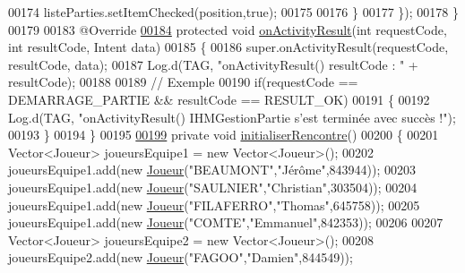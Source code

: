 \begin{DoxyCode}
00174                 listeParties.setItemChecked(position,\textcolor{keyword}{true});
00175 
00176             \}
00177         \});
00178     \}
00179 
00183     @Override
\hyperlink{classcom_1_1example_1_1area_1_1_i_h_m_gestion_rencontre_a2ab13355dbd1751f43ff54c534d0f021}{00184}     \textcolor{keyword}{protected} \textcolor{keywordtype}{void} \hyperlink{classcom_1_1example_1_1area_1_1_i_h_m_gestion_rencontre_a2ab13355dbd1751f43ff54c534d0f021}{onActivityResult}(\textcolor{keywordtype}{int} requestCode, \textcolor{keywordtype}{int} resultCode, Intent data)
00185     \{
00186         super.onActivityResult(requestCode, resultCode, data);
00187         Log.d(TAG, \textcolor{stringliteral}{"onActivityResult() resultCode : "} + resultCode);
00188 
00189         \textcolor{comment}{// Exemple}
00190         \textcolor{keywordflow}{if}(requestCode == DEMARRAGE\_PARTIE && resultCode == RESULT\_OK)
00191         \{
00192             Log.d(TAG, \textcolor{stringliteral}{"onActivityResult() IHMGestionPartie s'est terminée avec succès !"});
00193         \}
00194     \}
00195 
\hyperlink{classcom_1_1example_1_1area_1_1_i_h_m_gestion_rencontre_aedaadbb550aab497aac0501ced04a3eb}{00199}     \textcolor{keyword}{private} \textcolor{keywordtype}{void} \hyperlink{classcom_1_1example_1_1area_1_1_i_h_m_gestion_rencontre_aedaadbb550aab497aac0501ced04a3eb}{initialiserRencontre}()
00200     \{
00201         Vector<Joueur> joueursEquipe1 = \textcolor{keyword}{new} Vector<Joueur>();
00202         joueursEquipe1.add(\textcolor{keyword}{new} \hyperlink{classcom_1_1example_1_1area_1_1_joueur}{Joueur}(\textcolor{stringliteral}{"BEAUMONT"},\textcolor{stringliteral}{"Jérôme"},843944));
00203         joueursEquipe1.add(\textcolor{keyword}{new} \hyperlink{classcom_1_1example_1_1area_1_1_joueur}{Joueur}(\textcolor{stringliteral}{"SAULNIER"},\textcolor{stringliteral}{"Christian"},303504));
00204         joueursEquipe1.add(\textcolor{keyword}{new} \hyperlink{classcom_1_1example_1_1area_1_1_joueur}{Joueur}(\textcolor{stringliteral}{"FILAFERRO"},\textcolor{stringliteral}{"Thomas"},645758));
00205         joueursEquipe1.add(\textcolor{keyword}{new} \hyperlink{classcom_1_1example_1_1area_1_1_joueur}{Joueur}(\textcolor{stringliteral}{"COMTE"},\textcolor{stringliteral}{"Emmanuel"},842353));
00206 
00207         Vector<Joueur> joueursEquipe2 = \textcolor{keyword}{new} Vector<Joueur>();
00208         joueursEquipe2.add(\textcolor{keyword}{new} \hyperlink{classcom_1_1example_1_1area_1_1_joueur}{Joueur}(\textcolor{stringliteral}{"FAGOO"},\textcolor{stringliteral}{"Damien"},844549));

\end{DoxyCode}

